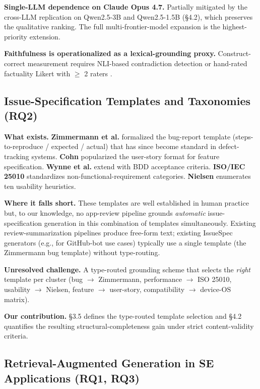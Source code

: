 \documentclass[sigconf, nonacm, anonymous, balance=false]{acmart}
\begin{document}
\textbf{Single-LLM dependence on Claude Opus 4.7.} Partially mitigated by the cross-LLM replication on Qwen2.5-3B and Qwen2.5-1.5B (\S4.2), which preserves the qualitative ranking. The full multi-frontier-model expansion is the highest-priority extension.

\textbf{Faithfulness is operationalized as a lexical-grounding proxy.} Construct-correct measurement requires NLI-based contradiction detection \cite{laban2022summac, kryscinski2020factcc} or hand-rated factuality Likert with $\geq$ 2 raters \cite{maynez2020faithfulness}.

\subsection{Issue-Specification Templates and Taxonomies (RQ2)}\label{issue-specification-templates-and-taxonomies-gap-g2-grounding}

\textbf{What exists.} \textbf{Zimmermann et al.} \cite{zimmermann2010} formalized the bug-report template (steps-to-reproduce / expected / actual) that has since become standard in defect-tracking systems. \textbf{Cohn} \cite{cohn2004user} popularized the user-story format for feature specification. \textbf{Wynne et al.} \cite{wynne2017cucumber} extend with BDD acceptance criteria. \textbf{ISO/IEC 25010} \cite{iso25010} standardizes non-functional-requirement categories. \textbf{Nielsen} \cite{nielsen1994} enumerates ten usability heuristics.

\textbf{Where it falls short.} These templates are well established in human practice but, to our knowledge, no app-review pipeline grounds \emph{automatic} issue-specification generation in this combination of templates simultaneously. Existing review-summarization pipelines produce free-form text; existing IssueSpec generators (e.g., for GitHub-bot use cases) typically use a single template (the Zimmermann bug template) without type-routing.

\textbf{Unresolved challenge.} A type-routed grounding scheme that selects the \emph{right} template per cluster (bug $\rightarrow$ Zimmermann, performance $\rightarrow$ ISO 25010, usability $\rightarrow$ Nielsen, feature $\rightarrow$ user-story, compatibility $\rightarrow$ device-OS matrix).

\textbf{Our contribution.} \S3.5 defines the type-routed template selection and \S4.2 quantifies the resulting structural-completeness gain under strict content-validity criteria.

\subsection{Retrieval-Augmented Generation in SE Applications (RQ1, RQ3)}\label{retrieval-augmented-generation-in-se-applications-gaps-g3-g4}
\end{document}
